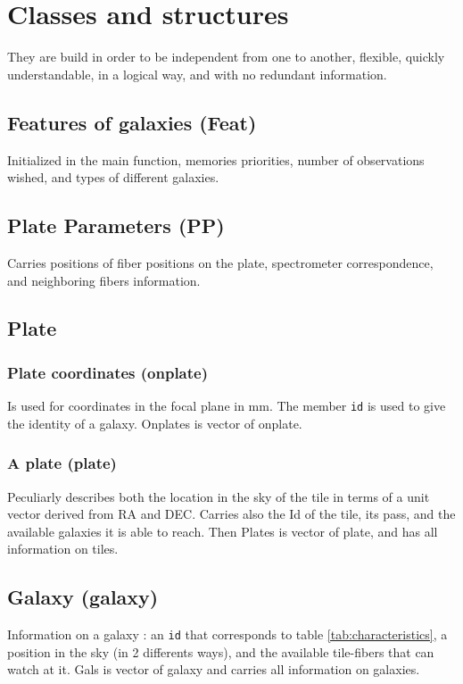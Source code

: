 \documentclass{article}
\begin{document}
 \section{Classes and structures}
They are build in order to be independent from one to another, flexible, quickly understandable, in a logical way, and with no redundant information.

 \subsection{Features of galaxies (Feat)}
Initialized in the main function, memories priorities, number of observations wished, and types of different galaxies.
 
\subsection{Plate Parameters (PP)}
Carries positions of fiber positions on the plate, spectrometer correspondence, and neighboring fibers information.

\subsection{Plate}

\subsubsection{Plate coordinates (onplate)}
  Is used for coordinates in the focal plane in mm.  The member {\tt id} is used to give the identity of a galaxy. Onplates is vector of onplate.

\subsubsection{A plate (plate)}
Peculiarly describes both the location in the sky of the tile in terms of a unit vector derived from RA and DEC. Carries also the Id of the tile, its pass, and the available galaxies it is able to reach. Then Plates is vector of plate, and has all information on tiles.

\subsection{Galaxy (galaxy)}
Information on a galaxy : an {\tt id} that corresponds to table \ref{tab:characteristics}, a position in the sky (in 2 differents ways), and the available tile-fibers that can watch at it. Gals is vector of galaxy and carries all information on galaxies.
\end{document}
